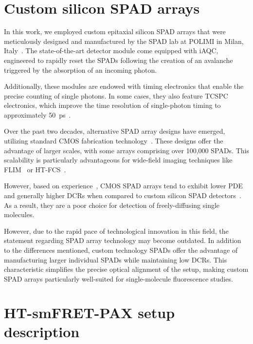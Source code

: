 \section{Custom silicon SPAD arrays}
\label{sec:SPAD_intro}

In this work, we employed custom epitaxial silicon \ac{SPAD} arrays that were meticulously designed and manufactured by the \ac{SPAD} lab at \ac{POLIMI} in Milan, Italy~\cite{ghioni_JSTQE_2007,gulinatti_JMO_2012,gulinatti_SPIE_2013}. 
The state-of-the-art detector module come equipped with \ac{iAQC}, engineered to rapidly reset the \ac{SPAD}s following the creation of an avalanche triggered by the absorption of an incoming photon.

Additionally, these modules are endowed with timing electronics that enable the precise counting of single photons. 
In some cases, they also feature \ac{TCSPC} electronics, which improve the time resolution of single-photon timing to approximately 50~ps~\cite{ingargiola_SPIE_2017}.

Over the past two decades, alternative \ac{SPAD} array designs have emerged, utilizing standard \ac{CMOS} fabrication technology~\cite{bruschini_SPIE_2017}. 
These designs offer the advantage of larger scales, with some arrays comprising over 100,000 \ac{SPAD}s. 
This scalability is particularly advantageous for wide-field imaging techniques like \ac{FLIM}~\cite{gyongy_IEEETED_2018, ulku_JSTQE_2019} or \ac{HT-FCS}~\cite{buchholz_BJ_2018}.

However, based on experience~\cite{ colyer_SPIE_2011}, \ac{CMOS} \ac{SPAD} arrays tend to exhibit lower \ac{PDE} and generally higher \ac{DCR}s when compared to custom silicon \ac{SPAD} detectors~\cite{ghioni_JSTQE_2007, michalet_JSTQE_2014}. 
As a result, they are a poor choice for detection of freely-diffusing single molecules.

However, due to the rapid pace of technological innovation in this field, the statement regarding \ac{SPAD} array technology may become outdated. 
In addition to the differences mentioned, custom technology \ac{SPAD}s offer the advantage of manufacturing larger individual \ac{SPAD}s while maintaining low \ac{DCR}s. 
This characteristic simplifies the precise optical alignment of the setup, making custom \ac{SPAD} arrays particularly well-suited for single-molecule fluorescence studies.

\section{HT-smFRET-PAX setup description}
\label{sec:smFRET-PAX_setup}

